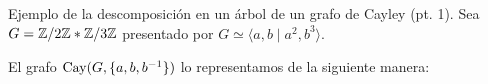\documentclass[aspectratio=169, 11pt]{beamer}
\begin{document}
	\begin{frame}{Ejemplo de la descomposición en un árbol de un grafo de Cayley (pt. 1).}
	Sea $G = \mathbb{Z} / 2\mathbb{Z} \ast \mathbb{Z} / 3\mathbb{Z} $ presentado por 
	$G \simeq \langle a,b \mid a^2, b^3 \rangle$.

	El grafo $\text{Cay}(G, \{ a,b,b^{-1} \})$ lo representamos de la siguiente manera:
	
	
					
					
			
	\end{frame}
	
\end{document}
